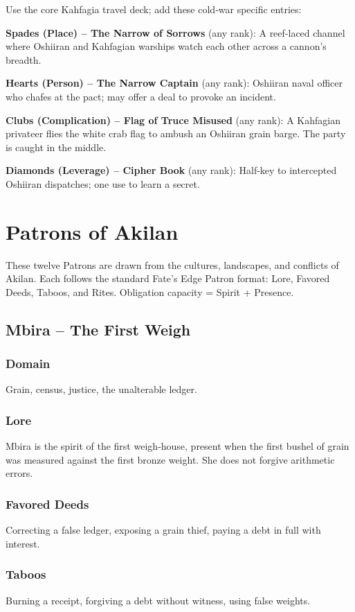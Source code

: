 \documentclass[11pt]{book}
\begin{document}
Use the core Kahfagia travel deck; add these cold‑war specific entries:

\textbf{Spades (Place) -- The Narrow of Sorrows} (any rank): A reef‑laced channel where Oshiiran and Kahfagian warships watch each other across a cannon's breadth.

\textbf{Hearts (Person) -- The Narrow Captain} (any rank): Oshiiran naval officer who chafes at the pact; may offer a deal to provoke an incident.

\textbf{Clubs (Complication) -- Flag of Truce Misused} (any rank): A Kahfagian privateer flies the white crab flag to ambush an Oshiiran grain barge. The party is caught in the middle.

\textbf{Diamonds (Leverage) -- Cipher Book} (any rank): Half‑key to intercepted Oshiiran dispatches; one use to learn a secret.

\chapter{Patrons of Akilan}

These twelve Patrons are drawn from the cultures, landscapes, and conflicts of Akilan. Each follows the standard Fate's Edge Patron format: Lore, Favored Deeds, Taboos, and Rites. Obligation capacity = Spirit + Presence.

\section{Mbira -- The First Weigh}
\subsection*{Domain}
Grain, census, justice, the unalterable ledger.
\subsection*{Lore}
Mbira is the spirit of the first weigh‑house, present when the first bushel of grain was measured against the first bronze weight. She does not forgive arithmetic errors.
\subsection*{Favored Deeds}
Correcting a false ledger, exposing a grain thief, paying a debt in full with interest.
\subsection*{Taboos}
Burning a receipt, forgiving a debt without witness, using false weights.
\end{document}
